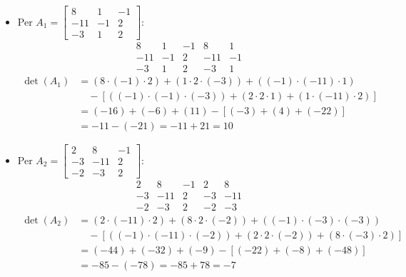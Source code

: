 \begin{itemize}
\item Per \(A_1 = \begin{bmatrix} 8 & 1 & -1 \\ -11 & -1 & 2 \\ -3 & 1 & 2 \end{bmatrix}\):
\[
\begin{array}{ccc|cc}
8 & 1 & -1 & 8 & 1 \\
-11 & -1 & 2 & -11 & -1 \\
-3 & 1 & 2 & -3 & 1
\end{array}
\]
\begin{align}
\det(A_1) &= (8 \cdot (-1) \cdot 2) + (1 \cdot 2 \cdot (-3)) + ((-1) \cdot (-11) \cdot 1) \nonumber \\
          &\quad - [((-1) \cdot (-1) \cdot (-3)) + (2 \cdot 2 \cdot 1) + (1 \cdot (-11) \cdot 2)] \nonumber \\
          &= (-16) + (-6) + (11) - [(-3) + (4) + (-22)] \nonumber \\
          &= -11 - (-21) = -11 + 21 = 10
\label{eq:detA1_3x3}
\end{align}

\item Per \(A_2 = \begin{bmatrix} 2 & 8 & -1 \\ -3 & -11 & 2 \\ -2 & -3 & 2 \end{bmatrix}\):
\[
\begin{array}{ccc|cc}
2 & 8 & -1 & 2 & 8 \\
-3 & -11 & 2 & -3 & -11 \\
-2 & -3 & 2 & -2 & -3
\end{array}
\]
\begin{align}
\det(A_2) &= (2 \cdot (-11) \cdot 2) + (8 \cdot 2 \cdot (-2)) + ((-1) \cdot (-3) \cdot (-3)) \nonumber \\
          &\quad - [((-1) \cdot (-11) \cdot (-2)) + (2 \cdot 2 \cdot (-2)) + (8 \cdot (-3) \cdot 2)] \nonumber \\
          &= (-44) + (-32) + (-9) - [(-22) + (-8) + (-48)] \nonumber \\
          &= -85 - (-78) = -85 + 78 = -7
\label{eq:detA2_3x3}
\end{align}


\end{itemize}

